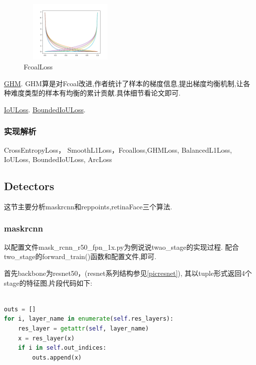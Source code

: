 \documentclass[UTF8]{ctexart}
\begin{document}
\begin{figure}[htbp]
	\centering
	\includegraphics[width=5cm,height=3cm]{./pic/Focal_01.png}
	\caption{FcoalLoss}
\end{figure}

\href{https://arxiv.org/abs/1811.05181}{GHM}.
GHM算是对Fcoal改进,作者统计了样本的梯度信息,提出梯度均衡机制,让各种难度类型的样本有均衡的累计贡献.具体细节看论文即可.

\href{https://arxiv.org/abs/1908.03851}{IoULoss}.
\href{https://arxiv.org/abs/1711.00164}{BoundedIoULoss}.

\subsubsection{实现解析}
CrossEntropyLoss， SmoothL1Loss，Fcoalloss,GHMLoss, BalancedL1Loss, IoULoss,
BoundedIoULoss, ArcLoss



\subsection{Detectors}
这节主要分析maskrcnn和reppoints,retinaFace三个算法.

\subsubsection{maskrcnn}
\label{maskrcnn}
以配置文件mask\_rcnn\_r50\_fpn\_1x.py为例说说twao\_stage的实现过程.
配合two\_stage的forward\_train()函数和配置文件,即可.

首先backbone为resnet50，(resnet系列结构参见\ref{picresnet}),
其以tuple形式返回4个stage的特征图,片段代码如下:
\lstset{style=mystyle}
\begin{lstlisting}[language=Python]

outs = []
for i, layer_name in enumerate(self.res_layers):
	res_layer = getattr(self, layer_name)
	x = res_layer(x)
	if i in self.out_indices:
		outs.append(x)

\end{lstlisting}
\end{document}
